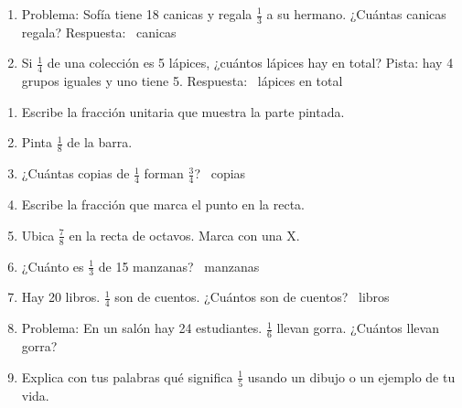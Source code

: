 \begin{wbpractice}
\begin{enumerate}
\item Problema: Sofía tiene 18 canicas y regala $\frac{1}{3}$ a su hermano. ¿Cuántas canicas regala?
\wbbox[2cm]
Respuesta: \wbblank\ canicas

\item Si $\frac{1}{4}$ de una colección es 5 lápices, ¿cuántos lápices hay en total? Pista: hay 4 grupos iguales y uno tiene 5.
\wbbox[2cm]
Respuesta: \wbblank\ lápices en total
\end{enumerate}
\end{wbpractice}

\begin{wbreview}
\begin{enumerate}
\item Escribe la fracción unitaria que muestra la parte pintada.
\begin{center}
\end{center}
\wbfracbox
{}

\item Pinta $\frac{1}{8}$ de la barra.
\begin{center}
\end{center}
\wbbox[1cm]

\item ¿Cuántas copias de $\frac{1}{4}$ forman $\frac{3}{4}$? \wbblank\ copias

\item Escribe la fracción que marca el punto en la recta.
\begin{center}
\end{center}
\wbfracbox
{}

\item Ubica $\frac{7}{8}$ en la recta de octavos. Marca con una X.
\begin{center}
\end{center}
\wbbox[1cm]

\item ¿Cuánto es $\frac{1}{3}$ de 15 manzanas? \wbblank\ manzanas

\item Hay 20 libros. $\frac{1}{4}$ son de cuentos. ¿Cuántos son de cuentos? \wbblank\ libros

\item Problema: En un salón hay 24 estudiantes. $\frac{1}{6}$ llevan gorra. ¿Cuántos llevan gorra?
\wbbox[2cm]

\item Explica con tus palabras qué significa $\frac{1}{5}$ usando un dibujo o un ejemplo de tu vida.
\wbbox[2.5cm]
\end{enumerate}
\end{wbreview}
